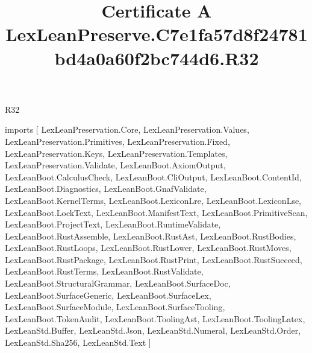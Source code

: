 \begin{lexlean}{R32}
\title{Certificate A LexLeanPreserve.C7e1fa57d8f24781bd4a0a60f2bc744d6.R32}
\begin{coremodule}
imports [
  LexLeanPreservation.Core,
  LexLeanPreservation.Values,
  LexLeanPreservation.Primitives,
  LexLeanPreservation.Fixed,
  LexLeanPreservation.Keys,
  LexLeanPreservation.Templates,
  LexLeanPreservation.Validate,
  LexLeanBoot.AxiomOutput,
  LexLeanBoot.CalculusCheck,
  LexLeanBoot.CliOutput,
  LexLeanBoot.ContentId,
  LexLeanBoot.Diagnostics,
  LexLeanBoot.GnafValidate,
  LexLeanBoot.KernelTerms,
  LexLeanBoot.LexiconLre,
  LexLeanBoot.LexiconLse,
  LexLeanBoot.LockText,
  LexLeanBoot.ManifestText,
  LexLeanBoot.PrimitiveScan,
  LexLeanBoot.ProjectText,
  LexLeanBoot.RuntimeValidate,
  LexLeanBoot.RustAssemble,
  LexLeanBoot.RustAst,
  LexLeanBoot.RustBodies,
  LexLeanBoot.RustLoops,
  LexLeanBoot.RustLower,
  LexLeanBoot.RustMoves,
  LexLeanBoot.RustPackage,
  LexLeanBoot.RustPrint,
  LexLeanBoot.RustSucceed,
  LexLeanBoot.RustTerms,
  LexLeanBoot.RustValidate,
  LexLeanBoot.StructuralGrammar,
  LexLeanBoot.SurfaceDoc,
  LexLeanBoot.SurfaceGeneric,
  LexLeanBoot.SurfaceLex,
  LexLeanBoot.SurfaceModule,
  LexLeanBoot.SurfaceTooling,
  LexLeanBoot.TokenAudit,
  LexLeanBoot.ToolingAst,
  LexLeanBoot.ToolingLatex,
  LexLeanStd.Buffer,
  LexLeanStd.Json,
  LexLeanStd.Numeral,
  LexLeanStd.Order,
  LexLeanStd.Sha256,
  LexLeanStd.Text
]


\end{coremodule}
\end{lexlean}
